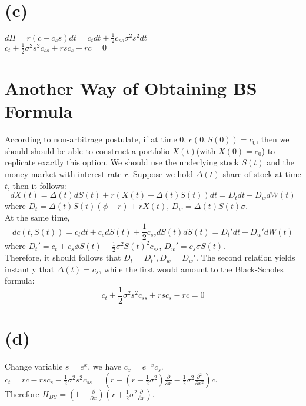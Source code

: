 \documentclass[12pt,a4paper]{paper}
\begin{document}
\section{(c)}
$d\Pi = r(c - c_s s)dt = c_t dt + \frac{1}{2} c_{ss} \sigma^2 s^2 dt$\\
$c_t + \frac{1}{2}\sigma^2 s^2 c_{ss} + rsc_s - rc = 0$

\section*{Another Way of Obtaining BS Formula}
According to non-arbitrage postulate, if at time $0$, $c(0, S(0)) = c_0$, then we should should be able to construct a portfolio $X(t)$(with $X(0) = c_0$) to replicate exactly this option. We should use the underlying stock $S(t)$ and the money market with interest rate $r$. Suppose we hold $\Delta(t)$ share of stock at time $t$, then it follows:
\begin{equation}
dX(t) = \Delta(t)dS(t) + r(X(t) - \Delta(t)S(t))dt = D_tdt + D_w dW(t)
\end{equation}
where $D_t = \Delta(t)S(t)(\phi - r) + r X(t)$, $D_w = \Delta(t)S(t)\sigma$.\\
\indent At the same time,
\begin{equation}
dc(t, S(t)) = c_t dt + c_s dS(t) + \frac{1}{2} c_{ss} dS(t)dS(t) = D_t' dt + D_w'dW(t)
\end{equation}
where $D_t' = c_t + c_s \phi S(t) + \frac{1}{2}\sigma^2 S(t)^2c_{ss}$, $D_w' = c_s \sigma S(t)$. \\
\indent Therefore, it should follows that $D_t = D_t', D_w = D_w'$. The second relation yields instantly that $\Delta(t) = c_s$, while the first would amount to the Black-Scholes formula:
\begin{equation}
c_t + \frac{1}{2}\sigma^2 s^2 c_{ss} + rsc_s - rc = 0
\end{equation}

\section{(d)}
Change variable $s = e^x$, we have $c_x = e^{-x}c_s$.\\
$c_t = rc - rsc_s - \frac{1}{2}\sigma^2 s^2 c_{ss} = (r - (r - \frac{1}{2}\sigma^2)\frac{\partial}{\partial x} - \frac{1}{2}\sigma^2 \frac{\partial^2}{\partial x^2}) c$.\\
\indent Therefore $H_{BS} = (1 - \frac{\partial}{\partial x})(r + \frac{1}{2} \sigma^2 \frac{\partial}{\partial x})$. 
\end{document}
